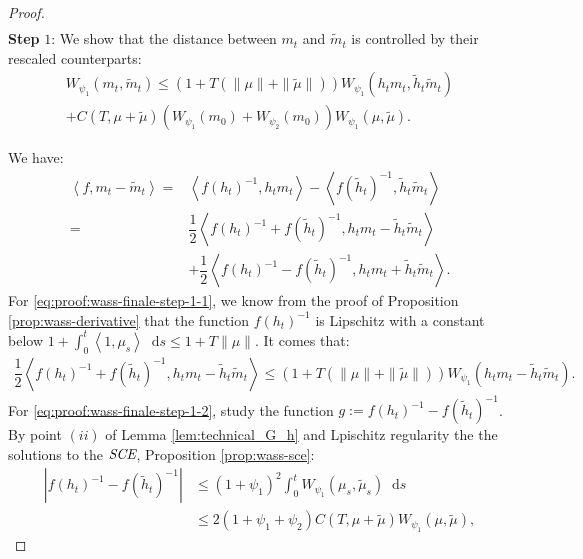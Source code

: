 \documentclass[11pt,a4paper]{article}
\newcommand{\RRP}{\mathbb{R}^+_*}
\newcommand{\MC}{\mathcal{M}}
\newcommand{\SCE}{\emph{SCE}}
\newcommand{\brac}[1]{\left\langle#1\right\rangle}
\newcommand{\dd}{\mathop{}\!\mathrm{d}}
\begin{document}
\begin{proof}
\begin{align*}
    \end{align*}
    \textbf{Step} $1$: We show that the distance between $m_t$ and $\tilde{m}_t$ is controlled by their rescaled counterparts:
    \begin{multline*}
        W_{\psi_1}(m_t ,\tilde{m}_t) \leq \left( 1 + T\left(\|\mu\| + \|\tilde{\mu}\|\right)\right)W_{\psi_1}(h_tm_t , \tilde{h}_t\tilde{m}_t) \\
        + C(T,\mu + \tilde{\mu})\left(W_{\psi_1}(m_0) + W_{\psi_2}(m_0)\right)W_{\psi_1}(\mu,\tilde{\mu}).
    \end{multline*}

    We have:
    \begin{subequations}
    \begin{align}
        \brac{f,m_t-\tilde{m}_t} 
        =& \brac{f(h_t)^{-1}, h_t m_t} - \brac{f(\tilde{h}_t)^{-1},\tilde{h}_t\tilde{m}_t}\nonumber \\
        =& \dfrac12\brac{f(h_t)^{-1} + f(\tilde{h}_t)^{-1}  ,h_tm_t - \tilde{h}_t\tilde{m}_t} \label{eq:proof:wass-finale-step-1-1} \\
        &+ \dfrac12\brac{f(h_t)^{-1} - f(\tilde{h}_t)^{-1},h_t m_t + \tilde{h}_t\tilde{m}_t} \label{eq:proof:wass-finale-step-1-2} .
    \end{align}
    \end{subequations}
    For \eqref{eq:proof:wass-finale-step-1-1}, we know from the proof of Proposition \ref{prop:wass-derivative} that the function $f(h_t)^{-1}$ is Lipschitz with a constant below $1 + \int_0^t \brac{1,\mu_s} \dd s \leq 1 + T\|\mu\|$. It comes that:
    \begin{align*}
        \dfrac12\brac{f(h_t)^{-1} + f(\tilde{h}_t)^{-1}  ,h_tm_t - \tilde{h}_t\tilde{m}_t}
        \leq\left( 1 + T\left(\|\mu\| + \|\tilde{\mu}\|\right)\right)W_{\psi_1}(h_tm_t - \tilde{h}_t\tilde{m}_t).
    \end{align*}
    For \eqref{eq:proof:wass-finale-step-1-2}, study the function $g:= f(h_t)^{-1} - f(\tilde{h}_t)^{-1}$. By point $(ii)$ of Lemma \ref{lem:technical_G_h} and Lpischitz regularity the the solutions to the $\SCE$, Proposition \ref{prop:wass-sce}:
    \begin{align*}
        \left| f(h_t)^{-1} - f(\tilde{h}_t)^{-1}\right|
        &\leq (1 + \psi_1)^2 \int_0^t W_{\psi_1}(\mu_s,\tilde{\mu}_s) \dd s \\
        &\leq 2\left( 1 + \psi_1 + \psi_2\right) C(T,\mu + \tilde{\mu})W_{\psi_1}(\mu,\tilde{\mu}),
    \end{align*}

\end{proof}
\end{document}
